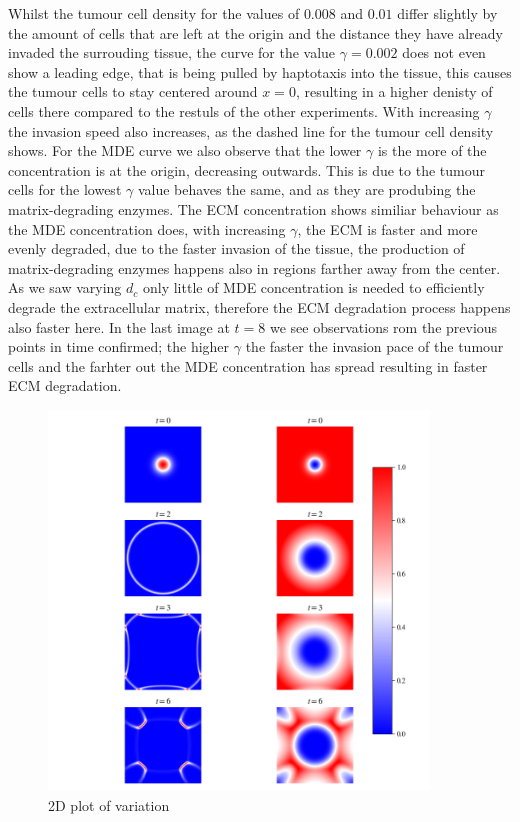 Whilst the tumour cell density for the values of $0.008$ and $0.01$ differ slightly by the amount of cells that are left at the origin and the distance they have already invaded the surrouding tissue, the curve for the value $\gamma=0.002$ does not even show a leading edge, that is being pulled by haptotaxis into the tissue, this causes the tumour cells to stay centered around $x=0$, resulting in a higher denisty of cells there compared to the restuls of the other experiments. With increasing $\gamma$ the invasion speed also increases, as the dashed line for the tumour cell density shows. 
For the MDE curve we also observe that the lower $\gamma$ is the more of the concentration is at the origin, decreasing outwards. This is due to the tumour cells for the lowest $\gamma$ value behaves the same, and as they are produbing the matrix-degrading enzymes. The ECM concentration shows similiar behaviour as the MDE concentration does, with increasing $\gamma$, the ECM is faster and more evenly degraded, due to the faster invasion of the tissue, the production of matrix-degrading enzymes happens also in regions farther away from the center. As we saw varying $d_c$ only little of MDE concentration is needed to efficiently degrade the extracellular matrix, therefore the ECM degradation process happens also faster here.\newline
In the last image at $t=8$ we see observations rom the previous points in time confirmed; the higher $\gamma$ the faster the invasion pace of the tumour cells and the farhter out the MDE concentration has spread resulting in faster ECM degradation.\newline 
\begin{figure}[h]
    \centering
    \includegraphics[width=0.9\textwidth]{resources/images/gamma_2D_plot.png}
    \caption{2D plot of variation}
    \label{fig:gamma_2D_plot}
\end{figure}
